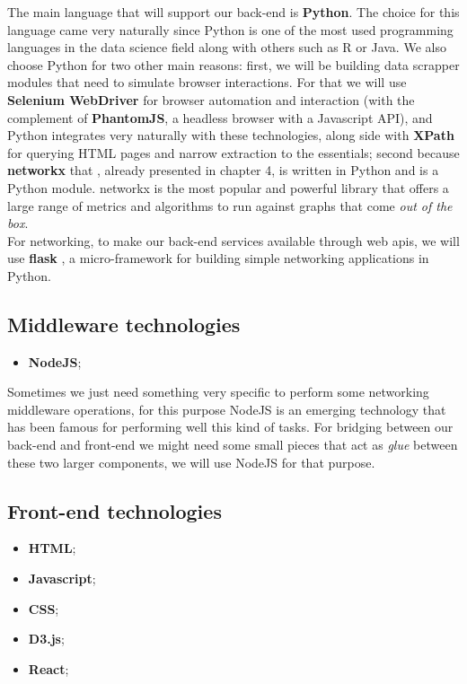 The main language that will support our back-end is \textbf{Python}. The choice for this language came very naturally since Python is one of the most used programming languages in the data science field along with others such as R or Java. We also choose Python for two other main reasons: first, we will be building data scrapper modules that need to simulate browser interactions.
 For that we will use \textbf{Selenium WebDriver} \citep{documentation2013selenium} for browser automation and interaction (with the complement of \textbf{PhantomJS}\citep{hidayat2013phantomjs}, a headless browser with a Javascript API), and Python integrates very naturally with these technologies, along side with \textbf{XPath} \citep{clark1999xml} for querying HTML pages and narrow extraction to the essentials; second because \textbf{networkx} that \citep{hagberg2013networkx}, already presented in chapter 4, is written in Python and is a Python module. networkx is the most popular and powerful library that offers a large range of metrics and algorithms to run against graphs that come \textit{out of the box}.\\
\indent For networking, to make our back-end services available through web \glspl{api}, we will use \textbf{flask} \citep{ronacher2015flask}, a micro-framework for building simple networking applications in Python.

\subsection{Middleware technologies}
\begin{itemize}
    \item \textbf{NodeJS};
\end{itemize}

Sometimes we just need something very specific to perform some networking middleware operations, for this purpose NodeJS \citep{nodejs} is an emerging technology
that has been famous for performing well this kind of tasks. For bridging between our back-end and front-end we might need some small pieces that act
as \textit{glue} between these two larger components, we will use NodeJS for that purpose.

\subsection{Front-end technologies}
\begin{itemize}
    \item \textbf{HTML};
    \item \textbf{Javascript};
    \item \textbf{CSS};
    \item \textbf{D3.js};
    \item \textbf{React};
\end{itemize}

